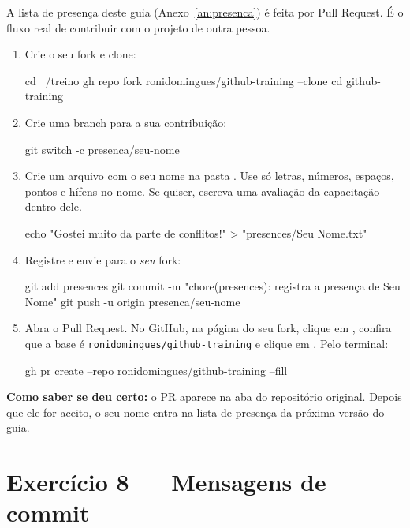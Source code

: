 A lista de presença deste guia (Anexo~\ref{an:presenca}) é feita por Pull
Request. É o fluxo real de contribuir com o projeto de outra pessoa.

\begin{enumerate}
  \item Crie o seu fork e clone:
\begin{bashcode}
cd ~/treino
gh repo fork ronidomingues/github-training --clone
cd github-training
\end{bashcode}

  \item Crie uma branch para a sua contribuição:
\begin{bashcode}
git switch -c presenca/seu-nome
\end{bashcode}

  \item Crie um arquivo com o seu nome na pasta . Use só
        letras, números, espaços, pontos e hífens no nome. Se quiser, escreva
        uma avaliação da capacitação dentro dele.
\begin{bashcode}
echo "Gostei muito da parte de conflitos!" > "presences/Seu Nome.txt"
\end{bashcode}

  \item Registre e envie para o \emph{seu} fork:
\begin{bashcode}
git add presences
git commit -m "chore(presences): registra a presença de Seu Nome"
git push -u origin presenca/seu-nome
\end{bashcode}

  \item Abra o Pull Request. No GitHub, na página do seu fork, clique em
        , confira que a base é
        \texttt{ronidomingues/github-training} e clique em
        . Pelo terminal:
\begin{bashcode}
gh pr create --repo ronidomingues/github-training --fill
\end{bashcode}
\end{enumerate}

\textbf{Como saber se deu certo:} o PR aparece na aba  do
repositório original. Depois que ele for aceito, o seu nome entra na lista
de presença da próxima versão do guia.

\section{Exercício 8 — Mensagens de commit}

